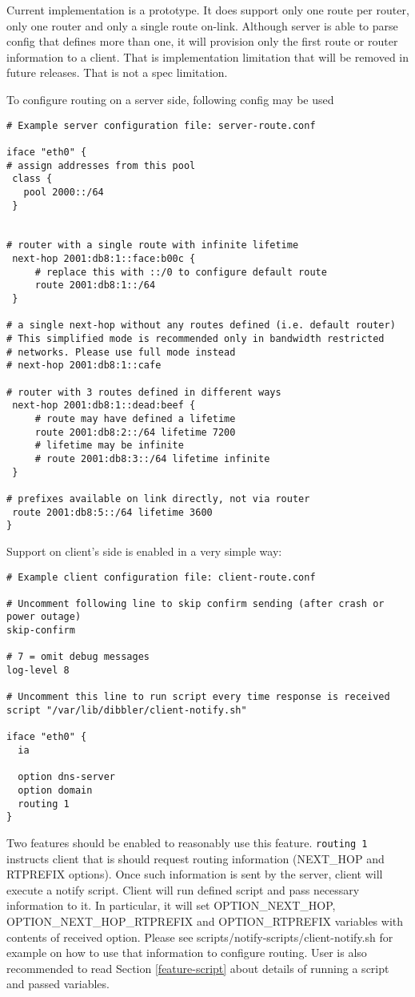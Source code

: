 \Note Current implementation is a prototype. It does support only one
route per router, only one router and only a single route
on-link. Although server is able to parse config that defines more
than one, it will provision only the first route or router information
to a client. That is implementation limitation that will be removed in
future releases. That is not a spec limitation.

To configure routing on a server side, following config may be used
\begin{lstlisting}
# Example server configuration file: server-route.conf

iface "eth0" {
# assign addresses from this pool
 class {
   pool 2000::/64
 }


# router with a single route with infinite lifetime
 next-hop 2001:db8:1::face:b00c {
     # replace this with ::/0 to configure default route
     route 2001:db8:1::/64
 }

# a single next-hop without any routes defined (i.e. default router)
# This simplified mode is recommended only in bandwidth restricted
# networks. Please use full mode instead
# next-hop 2001:db8:1::cafe

# router with 3 routes defined in different ways
 next-hop 2001:db8:1::dead:beef {
     # route may have defined a lifetime
     route 2001:db8:2::/64 lifetime 7200
     # lifetime may be infinite
     # route 2001:db8:3::/64 lifetime infinite
 }

# prefixes available on link directly, not via router
 route 2001:db8:5::/64 lifetime 3600
}
\end{lstlisting}

Support on client's side is enabled in a very simple way:
\begin{lstlisting}
# Example client configuration file: client-route.conf

# Uncomment following line to skip confirm sending (after crash or power outage)
skip-confirm

# 7 = omit debug messages
log-level 8

# Uncomment this line to run script every time response is received
script "/var/lib/dibbler/client-notify.sh"

iface "eth0" {
  ia

  option dns-server
  option domain
  routing 1
}
\end{lstlisting}

Two features should be enabled to reasonably use this
feature. \verb+routing 1+ instructs client that is should request routing
information (NEXT\_HOP and RTPREFIX options). Once such information is
sent by the server, client will execute a notify script. Client will
run defined script and pass necessary information to it. In
particular, it will set OPTION\_NEXT\_HOP, OPTION\_NEXT\_HOP\_RTPREFIX
and OPTION\_RTPREFIX variables with contents of received
option. Please see scripts/notify-scripts/client-notify.sh for example
on how to use that information to configure routing. User is also
recommended to read Section \ref{feature-script} about details of
running a script and passed variables.

